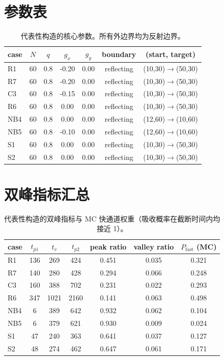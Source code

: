 \documentclass[11pt,fontset=fandol]{ctexart}
\begin{document}
\section*{参数表}
\begin{table}[!htbp]
  \centering
  \begin{tabular}{lcccccc}
    \toprule
    case & $N$ & $q$ & $g_x$ & $g_y$ & boundary & (start, target) \\
    \midrule
    R1 & 60 & 0.8 & -0.20 & 0.00 & reflecting & (10,30)$\to$(50,30) \\
    R7 & 60 & 0.8 & -0.20 & 0.00 & reflecting & (10,30)$\to$(50,30) \\
    C3 & 60 & 0.8 & -0.15 & 0.00 & reflecting & (10,30)$\to$(50,30) \\
    R6 & 60 & 0.8 & 0.00 & 0.00 & reflecting & (10,30)$\to$(50,30) \\
    NB4 & 60 & 0.8 & 0.00 & 0.00 & reflecting & (12,60)$\to$(10,60) \\
    NB5 & 60 & 0.8 & -0.10 & 0.00 & reflecting & (12,60)$\to$(10,60) \\
    S1 & 60 & 0.8 & 0.00 & 0.00 & reflecting & (10,30)$\to$(50,30) \\
    S2 & 60 & 0.8 & 0.00 & 0.00 & reflecting & (10,30)$\to$(50,30) \\
    \bottomrule
  \end{tabular}
  \caption{代表性构造的核心参数。所有外边界均为反射边界。}
  \label{tab:params}
\end{table}

\section*{双峰指标汇总}
\begin{table}[!htbp]
  \centering
  \footnotesize
  \begin{tabular}{lcccccc}
    \toprule
    case & $t_{p1}$ & $t_v$ & $t_{p2}$ & peak ratio & valley ratio & $P_{\text{fast}}$ (MC) \\
    \midrule
    R1 & 136 & 269 & 424 & 0.451 & 0.035 & 0.321 \\
    R7 & 140 & 280 & 428 & 0.294 & 0.066 & 0.248 \\
    C3 & 160 & 388 & 702 & 0.231 & 0.022 & 0.293 \\
    R6 & 347 & 1021 & 2160 & 0.141 & 0.063 & 0.498 \\
    NB4 & 6 & 389 & 642 & 0.932 & 0.062 & 0.104 \\
    NB5 & 6 & 379 & 621 & 0.930 & 0.009 & 0.024 \\
    S1 & 47 & 240 & 363 & 0.641 & 0.037 & 0.127 \\
    S2 & 48 & 274 & 462 & 0.647 & 0.061 & 0.171 \\
    \bottomrule
  \end{tabular}
  \caption{代表性构造的双峰指标与 MC 快通道权重（吸收概率在截断时间内均接近 1）。}
  \label{tab:metrics}
\end{table}
\end{document}
